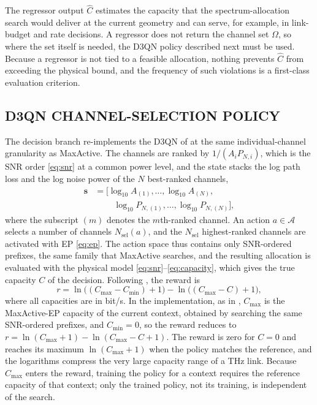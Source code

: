 \documentclass{ieee-ojvt}
\begin{document}
The regressor output $\hat C$ estimates the capacity that the spectrum-allocation search
would deliver at the current geometry and can serve, for example, in link-budget and
rate decisions. A regressor does not return the channel set $\Omega$, so where the set
itself is needed, the D3QN policy described next must be used. Because a regressor is not
tied to a feasible allocation, nothing prevents $\hat C$ from exceeding the physical
bound, and the frequency of such violations is a first-class evaluation criterion.

\subsection{D3QN CHANNEL-SELECTION POLICY}
\label{sec:ml-d3qn}
The decision branch re-implements the D3QN of \cite{elcik2025d3qn} at the same
individual-channel granularity as MaxActive. The channels are ranked by
$1/(A_iP_{N,i})$, which is the SNR order \eqref{eq:snr} at a common power level, and the
state stacks the log path loss and the log noise power of the $N$ best-ranked channels,
\begin{align}
\mathbf{s}&=\big[\log_{10}A_{(1)},\dots,\log_{10}A_{(N)},\nonumber\\
&\qquad\ \log_{10}P_{N,(1)},\dots,\log_{10}P_{N,(N)}\big],
\label{eq:state}
\end{align}
where the subscript $(m)$ denotes the $m$th-ranked channel. An action $a\in\mathcal{A}$
selects a number of channels $N_{\text{sel}}(a)$, and the $N_{\text{sel}}$ highest-ranked
channels are activated with EP \eqref{eq:ep}. The action space thus contains only
SNR-ordered prefixes, the same family that MaxActive searches, and the resulting
allocation is evaluated with the physical model \eqref{eq:snr}--\eqref{eq:capacity}, which
gives the true capacity $C$ of the decision. Following \cite{elcik2025d3qn}, the reward is
\begin{equation}
r=\ln\!\big((C_{\max}-C_{\min})+1\big)-\ln\!\big((C_{\max}-C)+1\big),
\label{eq:reward}
\end{equation}
where all capacities are in bit/s. In the implementation, as in \cite{elcik2025d3qn},
$C_{\max}$ is the MaxActive-EP capacity of the current context, obtained by searching the
same SNR-ordered prefixes, and $C_{\min}=0$, so the reward reduces to
$r=\ln(C_{\max}+1)-\ln(C_{\max}-C+1)$. The reward is zero for $C=0$ and reaches its
maximum $\ln(C_{\max}+1)$ when the policy matches the reference, and the logarithms
compress the very large capacity range of a THz link. Because $C_{\max}$ enters the
reward, training the policy for a context requires the reference capacity of that
context; only the trained policy, not its training, is independent of the search.
\end{document}
